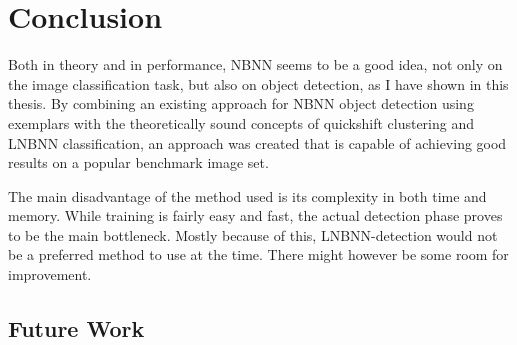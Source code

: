 
\section{Conclusion} %
\label{cha:conclusion}

Both in theory and in performance, NBNN seems to be a good idea, not only on the image classification task, but also on object detection, as I have shown in this thesis. By combining an existing approach for NBNN object detection using exemplars with the theoretically sound concepts of quickshift clustering and LNBNN classification, an approach was created that is capable of achieving good results on a popular benchmark image set.

The main disadvantage of the method used is its complexity in both time and memory. While training is fairly easy and fast, the actual detection phase proves to be the main bottleneck. Mostly because of this, LNBNN-detection would not be a preferred method to use at the time. There might however be some room for improvement.


\subsection{Future Work} %
\label{sec:future_work}




